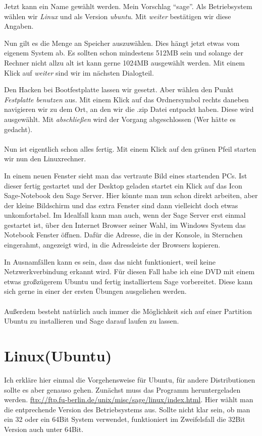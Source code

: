 \documentclass[a4paper,10pt]{article}
\begin{document}
Jetzt kann ein Name gewählt werden. 
Mein Vorschlag \textquotedblleft sage\textquotedblright. Als Betriebsystem wählen wir \emph{Linux} und als Version \emph{ubuntu}.
Mit \emph{weiter} bestätigen wir diese Angaben. 

Nun gilt es die Menge an Speicher auszuwählen. Dies hängt jetzt etwas vom eigenem 
System ab. Es sollten schon mindestens 512MB sein und solange der Rechner nicht allzu alt ist kann gerne 1024MB
ausgewählt werden. Mit einem Klick auf \emph{weiter} sind wir im nächsten Dialogteil.

Den Hacken bei Bootfestplatte lassen wir gesetzt. Aber wählen den Punkt \emph{Festplatte benutzen} aus. Mit einem Klick auf das 
Ordnersymbol rechts daneben navigieren wir zu dem Ort, an den wir die .zip Datei entpackt haben. Diese wird ausgewählt. Mit 
\emph{abschließen} wird der Vorgang abgeschlossen (Wer hätte es gedacht).
\paragraph{}
Nun ist eigentlich schon alles fertig. Mit einem Klick auf den grünen Pfeil starten wir nun den Linuxrechner.

In einem neuen Fenster sieht man das vertraute Bild eines startenden PCs. Ist dieser fertig gestartet und der Desktop geladen 
 startet ein Klick auf das Icon Sage-Notebook den Sage Server.
Hier könnte man nun schon direkt arbeiten, aber der kleine Bildschirm und das extra Fenster sind dann vielleicht doch etwas unkomfortabel.
Im Idealfall kann man auch, wenn der Sage Server erst einmal gestartet ist, über den Internet Browser seiner Wahl, im Windows System
das Notebook Fenster öffnen. Dafür die Adresse, die in der Konsole, in Sternchen eingerahmt, angezeigt wird, in die Adressleiste der Browsers 
kopieren.

In Ausnamfällen kann es sein, dass das nicht funktioniert, weil keine Netzwerkverbindung erkannt wird. Für diesen Fall habe ich eine
DVD mit einem etwas großzügerem Ubuntu und fertig installiertem Sage vorbereitet. Diese kann sich gerne in einer der ersten Übungen
ausgeliehen werden.
\paragraph{}
Außerdem besteht natürlich auch immer die Möglichkeit sich auf einer Partition Ubuntu zu installieren und Sage darauf laufen zu lassen.




\section{Linux(Ubuntu)}
Ich erkläre hier einmal die Vorgehensweise für Ubuntu, für andere Distributionen sollte es aber genauso gehen.
Zunächst muss das Programm heruntergeladen werden. \url{ftp://ftp.fu-berlin.de/unix/misc/sage/linux/index.html}. Hier wählt man die 
entprechende Version des Betriebsystems aus. Sollte nicht klar sein, ob man ein 32 oder ein 64Bit System verwendet, funktioniert
im Zweifelsfall die 32Bit Version auch unter 64Bit. 
\end{document}
